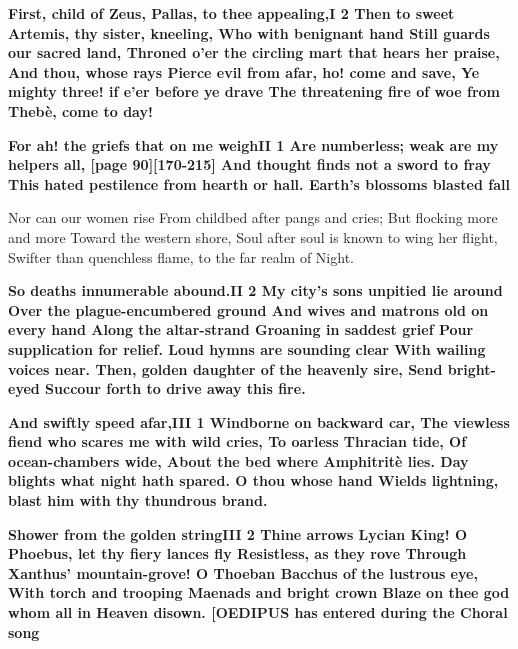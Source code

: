 \documentclass[11pt,letter]{book}
\begin{document}
\par \textbf{First, child of Zeus, Pallas, to thee appealing,I 2 Then to sweet Artemis, thy sister, kneeling, Who with benignant hand Still guards our sacred land, Throned o’er the circling mart that hears her praise, And thou, whose rays Pierce evil from afar, ho! come and save, Ye mighty three! if e’er before ye drave The threatening fire of woe from Thebè, come to day!}
\par 

\par \textbf{For ah! the griefs that on me weighII 1 Are numberless; weak are my helpers all, [page 90][170-215] And thought finds not a sword to fray This hated pestilence from hearth or hall. Earth’s blossoms blasted fall}
\par   Nor can our women rise From childbed after pangs and cries; But flocking more and more Toward the western shore, Soul after soul is known to wing her flight, Swifter than quenchless flame, to the far realm of Night.

\par \textbf{So deaths innumerable abound.II 2 My city’s sons unpitied lie around Over the plague-encumbered ground And wives and matrons old on every hand Along the altar-strand Groaning in saddest grief Pour supplication for relief. Loud hymns are sounding clear With wailing voices near. Then, golden daughter of the heavenly sire, Send bright-eyed Succour forth to drive away this fire.}
\par 

\par \textbf{And swiftly speed afar,III 1 Windborne on backward car, The viewless fiend who scares me with wild cries, To oarless Thracian tide, Of ocean-chambers wide, About the bed where Amphitritè lies. Day blights what night hath spared. O thou whose hand Wields lightning, blast him with thy thundrous brand.}
\par 

\par \textbf{Shower from the golden stringIII 2 Thine arrows Lycian King! O Phoebus, let thy fiery lances fly Resistless, as they rove Through Xanthus’ mountain-grove! O Thoeban Bacchus of the lustrous eye, With torch and trooping Maenads and bright crown Blaze on thee god whom all in Heaven disown. [OEDIPUS has entered during the Choral song}
\par 
\end{document}
